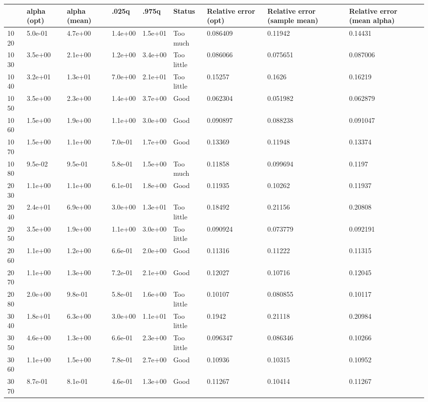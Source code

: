 \begin{tabular}{lllllllll}
& alpha (opt) & alpha (mean) & .025q & .975q & Status & Relative error (opt) & Relative error (sample mean) & Relative error (mean alpha) \\ 
\hline 
10  20 & 5.0e-01 & 4.7e+00 & 1.4e+00 & 1.5e+01 & Too much & 0.086409 & 0.11942 & 0.14431 \\ \hline 
10  30 & 3.5e+00 & 2.1e+00 & 1.2e+00 & 3.4e+00 & Too little & 0.086066 & 0.075651 & 0.087006 \\ \hline 
10  40 & 3.2e+01 & 1.3e+01 & 7.0e+00 & 2.1e+01 & Too little & 0.15257 & 0.1626 & 0.16219 \\ \hline 
10  50 & 3.5e+00 & 2.3e+00 & 1.4e+00 & 3.7e+00 & Good & 0.062304 & 0.051982 & 0.062879 \\ \hline 
10  60 & 1.5e+00 & 1.9e+00 & 1.1e+00 & 3.0e+00 & Good & 0.090897 & 0.088238 & 0.091047 \\ \hline 
10  70 & 1.5e+00 & 1.1e+00 & 7.0e-01 & 1.7e+00 & Good & 0.13369 & 0.11948 & 0.13374 \\ \hline 
10  80 & 9.5e-02 & 9.5e-01 & 5.8e-01 & 1.5e+00 & Too much & 0.11858 & 0.099694 & 0.1197 \\ \hline 
20  30 & 1.1e+00 & 1.1e+00 & 6.1e-01 & 1.8e+00 & Good & 0.11935 & 0.10262 & 0.11937 \\ \hline 
20  40 & 2.4e+01 & 6.9e+00 & 3.0e+00 & 1.3e+01 & Too little & 0.18492 & 0.21156 & 0.20808 \\ \hline 
20  50 & 3.5e+00 & 1.9e+00 & 1.1e+00 & 3.0e+00 & Too little & 0.090924 & 0.073779 & 0.092191 \\ \hline 
20  60 & 1.1e+00 & 1.2e+00 & 6.6e-01 & 2.0e+00 & Good & 0.11316 & 0.11222 & 0.11315 \\ \hline 
20  70 & 1.1e+00 & 1.3e+00 & 7.2e-01 & 2.1e+00 & Good & 0.12027 & 0.10716 & 0.12045 \\ \hline 
20  80 & 2.0e+00 & 9.8e-01 & 5.8e-01 & 1.6e+00 & Too little & 0.10107 & 0.080855 & 0.10117 \\ \hline 
30  40 & 1.8e+01 & 6.3e+00 & 3.0e+00 & 1.1e+01 & Too little & 0.1942 & 0.21118 & 0.20984 \\ \hline 
30  50 & 4.6e+00 & 1.3e+00 & 6.6e-01 & 2.3e+00 & Too little & 0.096347 & 0.086346 & 0.10266 \\ \hline 
30  60 & 1.1e+00 & 1.5e+00 & 7.8e-01 & 2.7e+00 & Good & 0.10936 & 0.10315 & 0.10952 \\ \hline 
30  70 & 8.7e-01 & 8.1e-01 & 4.6e-01 & 1.3e+00 & Good & 0.11267 & 0.10414 & 0.11267 \\ \hline 

\end{tabular}
